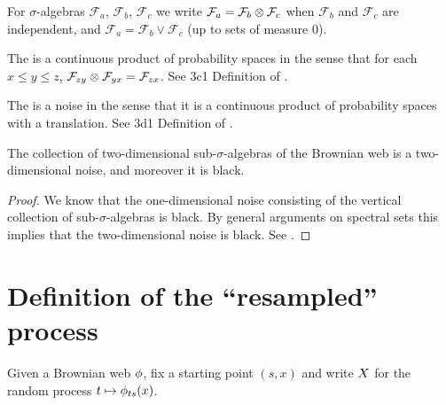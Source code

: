 {\begin{note}
  \newcommand{\F}{\mathcal{F}}

  For $\sigma$-algebras $\F_a$, $\F_b$, $\F_c$ we write $\F_a = \F_b
  \tensor \F_c$ when $\F_b$ and $\F_c$ are independent, and $\F_a =
  \F_b \vee \F_c$ (up to sets of measure $0$).
\end{note}

\begin{theorem}
  The \brownianwebnoise{}
  is a continuous product of probability spaces in the sense that
  for each $x \le y \le z$, $\mathcal{F}_{z y} \otimes \mathcal{F}_{y x} =
  \mathcal{F}_{z x}$.
  See 3c1 Definition of
  \cite{tsirelson-nonclassical-stochastic-flows}.
\end{theorem}

\begin{theorem}
  The \brownianwebnoise{} is a noise in the sense that it is a
  continuous product of probability spaces with a translation.
  See 3d1 Definition of
  \cite{tsirelson-nonclassical-stochastic-flows}.
\end{theorem}


\begin{theorem}
  The collection of two-dimensional sub-$\sigma$-algebras of the
  Brownian web is a two-dimensional noise, and moreover it is black.
\end{theorem}

\begin{proof}
  We know that the one-dimensional noise consisting of the vertical
  collection of sub-$\sigma$-algebras is black.  By general arguments
  on spectral sets this implies that the two-dimensional noise is
  black.  See \cite{tsirelson-classicality-blackness-spectrum}.
\end{proof}

\section{Definition of the ``resampled'' process}

\newcommand{\reservoir}{\mathcal{G}}

\newcommand{\twostrips}{\commafactor{\infty}{0} \tensor \commafactor{0}{-\infty}}
\newcommand{\onestrip}{\commafactor{\infty}{-\infty}}
\newcommand{\twostripsreservoir}{\twostrips \tensor \reservoir}

\begin{definition}
Given a Brownian web $\phi$, fix a starting point $(s,x)$ and write
$X$ for the random process $t \mapsto \phi_{ts}(x)$.
\end{definition}

}
